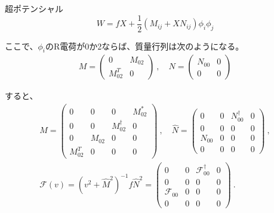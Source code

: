 \documentclass[
  unicode,a4paper,9pt,
  xcolor = {dvipsnames,svgnames},
  hyperref ={colorlinks=true,citecolor=Navy,linkcolor=NavyBlue,urlcolor=purple},
  ja=standard,lualatex
]{beamer}
\begin{document}
\begin{frame}

  超ポテンシャル
  \begin{equation}
    W
    =
    fX+\frac{1}{2}(M_{ij}+XN_{ij})\phi_{i}\phi_{j}
    \nonumber
  \end{equation}

  ここで、$\phi_{i}$のR電荷が0か2ならば、質量行列は次のようになる。
  \begin{eqnarray}
    M
    =
    \begin{pmatrix}
      0          & M_{02} \\
      M_{02}^{T} & 0
    \end{pmatrix}
    \ ,\quad
    N
    =
    \begin{pmatrix}
      N_{00} & 0 \\
      0      & 0
    \end{pmatrix}
    \nonumber
  \end{eqnarray}

  すると、
  \begin{gather}
    \hat{M}
    =
    \begin{pmatrix}
      0 & 0 & 0 & M_{02}^{*} \\
      0 & 0 & M_{02}^{\dag} & 0 \\
      0 & M_{02} & 0 & 0 \\
      M_{02}^{T} & 0 & 0 & 0
    \end{pmatrix}
    \ ,\quad
    \hat{N}
    =
    \begin{pmatrix}
      0 & 0 & N_{00}^{\dag} & 0 \\
      0 & 0 & 0 & 0 \\
      N_{00} & 0 & 0 & 0 \\
      0 & 0 & 0 & 0 
    \end{pmatrix}
    \ ,
    \nonumber
    \\
    \mathcal{F}(v)
    =
    (v^2+\hat{M}^2)^{-1}f\hat{N}^2
    =
    \begin{pmatrix}
      0 & 0 & \mathcal{F}_{00}^{\dag} & 0 \\
      0 & 0 & 0 & 0 \\
      \mathcal{F}_{00} & 0 & 0 & 0 \\
      0 & 0 & 0 & 0       
    \end{pmatrix}
    \ .
    \nonumber
  \end{gather}

\end{frame}
\end{document}
